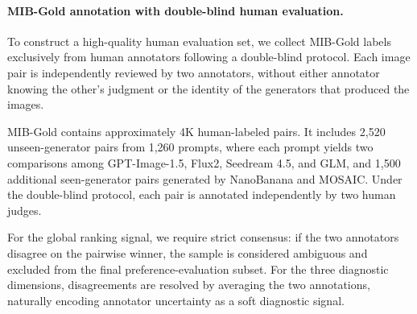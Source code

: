 \paragraph{MIB-Gold annotation with double-blind human evaluation.}
To construct a high-quality human evaluation set, we collect MIB-Gold labels exclusively from human annotators following a double-blind protocol. Each image pair is independently reviewed by two annotators, without either annotator knowing the other's judgment or the identity of the generators that produced the images.

MIB-Gold contains approximately 4K human-labeled pairs. It includes 2,520 unseen-generator pairs from 1,260 prompts, where each prompt yields two comparisons among GPT-Image-1.5, Flux2, Seedream 4.5, and GLM, and 1,500 additional seen-generator pairs generated by NanoBanana and MOSAIC. Under the double-blind protocol, each pair is annotated independently by two human judges.

For the global ranking signal, we require strict consensus: if the two annotators disagree on the pairwise winner, the sample is considered ambiguous and excluded from the final preference-evaluation subset. For the three diagnostic dimensions, disagreements are resolved by averaging the two annotations, naturally encoding annotator uncertainty as a soft diagnostic signal.
